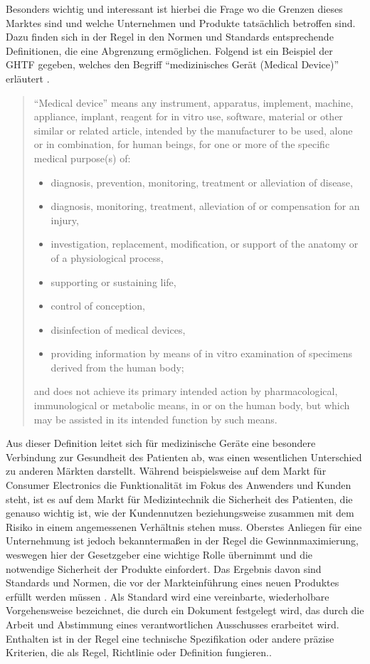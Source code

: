 \documentclass[a4paper,12pt]{report}
\begin{document}
Besonders wichtig und interessant ist hierbei die Frage wo die Grenzen dieses Marktes sind und welche Unternehmen und Produkte tatsächlich betroffen sind. Dazu finden sich in der Regel in den Normen und Standards entsprechende Definitionen, die eine Abgrenzung ermöglichen. Folgend ist ein Beispiel der \ac{GHTF} gegeben, welches den Begriff "`medizinisches Gerät (Medical Device)"' erläutert \citep[][S. 6]{GHTF2012}.
\begin{quote}
"`Medical device"' means any instrument, apparatus, implement, machine, appliance, implant, reagent for in vitro use, software, material or other similar or related article, intended by the manufacturer to be used, alone or in combination, for human beings, for one or more of the specific medical purpose(s) of:
\begin{itemize}
\item diagnosis, prevention, monitoring, treatment or alleviation of disease,
\item diagnosis, monitoring, treatment, alleviation of or compensation for an injury,
\item investigation, replacement, modification, or support of the anatomy or of a physiological process,
\item supporting or sustaining life,
\item control of conception,
\item disinfection of medical devices,
\item providing information by means of in vitro examination of specimens derived from the human body;
\end{itemize}
and does not achieve its primary intended action by pharmacological, immunological or metabolic means, in or on the human body, but which may be assisted in its intended function by such means.
\end{quote}

Aus dieser Definition leitet sich für medizinische Geräte eine besondere Verbindung zur Gesundheit des Patienten ab, was einen wesentlichen Unterschied zu anderen Märkten darstellt. Während beispielsweise auf dem Markt für Consumer Electronics die Funktionalität im Fokus des Anwenders und Kunden steht, ist es auf dem Markt für Medizintechnik die Sicherheit des Patienten, die genauso wichtig ist, wie der Kundennutzen beziehungsweise zusammen mit dem Risiko in einem angemessenen Verhältnis stehen muss. Oberstes Anliegen für eine Unternehmung ist jedoch bekanntermaßen in der Regel die Gewinnmaximierung, weswegen hier der Gesetzgeber eine wichtige Rolle übernimmt und die notwendige Sicherheit der Produkte einfordert. Das Ergebnis davon sind Standards und Normen, die vor der Markteinführung eines neuen Produktes erfüllt werden müssen \citep[vgl.][S. 3]{Higson2002}. Als Standard wird eine vereinbarte, wiederholbare Vorgehensweise bezeichnet, die durch ein Dokument festgelegt wird, das durch die Arbeit und Abstimmung eines verantwortlichen Ausschusses erarbeitet wird. Enthalten ist in der Regel eine technische Spezifikation oder andere präzise Kriterien, die als Regel, Richtlinie oder Definition fungieren.\citep[vgl.][S. 125-143]{Wong2013}.
\end{document}
